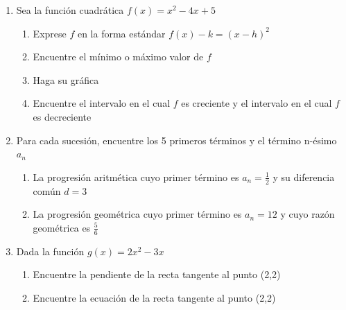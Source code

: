 \documentclass[letterpaper,fleqn]{article}
\begin{document}
\begin{enumerate}
\begin{enumerate}
\begin{enumerate}
\end{enumerate}
\end{enumerate}
\item Sea la función cuadrática $f(x)=x^{2}-4x+5$
\begin{enumerate}
\item Exprese $f$ en la forma estándar $f(x)-k=(x-h)^{2}$\noanswer
\newpage
\item Encuentre el mínimo o máximo valor de $f$\noanswer[20pt]
\item Haga su gráfica
\begin{center}
\end{center}
\item Encuentre el intervalo en el cual $f$ es creciente y el intervalo en el cual $f$ es decreciente \noanswer[30pt]
\end{enumerate}
\item Para cada sucesión, encuentre los 5 primeros términos y el término n-ésimo $a_{n}$
\begin{enumerate}
\item La progresión aritmética cuyo primer término es $a_{n}=\frac{1}{2}$ y su diferencia común $d=3$ \noanswer[50pt]
\item La progresión geométrica cuyo primer término es $a_{n}=12$ y cuyo razón geométrica es $\frac{5}{6}$ \noanswer[50pt]
\end{enumerate}
\item Dada la función $g(x)=2x^{2}-3x$ 
\begin{enumerate}
\item Encuentre la pendiente de la recta tangente al punto (2,2)\noanswer
\item Encuentre la ecuación de la recta tangente al punto (2,2)\noanswer
\end{enumerate}
 \end{enumerate}
\end{document}
